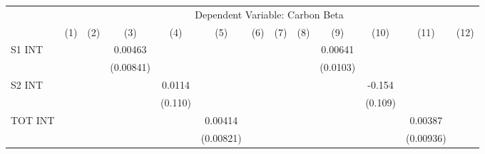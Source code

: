 {
\def\sym#1{\ifmmode^{#1}\else\(^{#1}\)\fi}
\begin{tabular}{l*{12}{c}}
\hline\hline
                    &\multicolumn{12}{c}{Dependent Variable: Carbon Beta}                                                                                                                                                                                                                   \\\cmidrule(lr){2-13}
                    &\multicolumn{1}{c}{(1)}         &\multicolumn{1}{c}{(2)}         &\multicolumn{1}{c}{(3)}         &\multicolumn{1}{c}{(4)}         &\multicolumn{1}{c}{(5)}         &\multicolumn{1}{c}{(6)}         &\multicolumn{1}{c}{(7)}         &\multicolumn{1}{c}{(8)}         &\multicolumn{1}{c}{(9)}         &\multicolumn{1}{c}{(10)}         &\multicolumn{1}{c}{(11)}         &\multicolumn{1}{c}{(12)}         \\
\hline
S1 INT              &                     &                     &     0.00463         &                     &                     &                     &                     &                     &     0.00641         &                     &                     &                     \\
                    &                     &                     &   (0.00841)         &                     &                     &                     &                     &                     &    (0.0103)         &                     &                     &                     \\
S2 INT              &                     &                     &                     &      0.0114         &                     &                     &                     &                     &                     &      -0.154         &                     &                     \\
                    &                     &                     &                     &     (0.110)         &                     &                     &                     &                     &                     &     (0.109)         &                     &                     \\
TOT INT             &                     &                     &                     &                     &     0.00414         &                     &                     &                     &                     &                     &     0.00387         &                     \\
                    &                     &                     &                     &                     &   (0.00821)         &                     &                     &                     &                     &                     &   (0.00936)         &                     \\

\end{tabular}}
